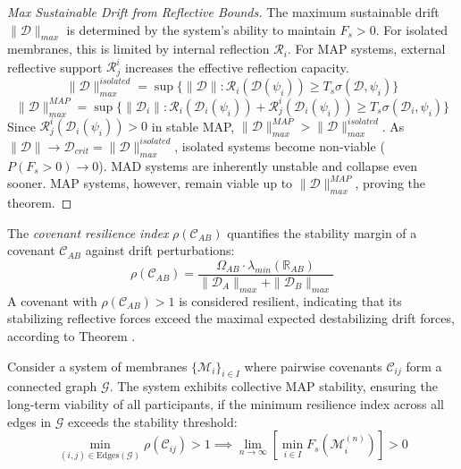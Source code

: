 \begin{proof}[Max Sustainable Drift from Reflective Bounds]
\label{proof:bk5_max_sustainable_drift}
The maximum sustainable drift $\|\mathcal{D}\|_{max}$ is determined by the system's ability to maintain $F_s > 0$. For isolated membranes, this is limited by internal reflection $\mathcal{R}_i$. For MAP systems, external reflective support $\mathcal{R}_j^i$ increases the effective reflection capacity.
\begin{equation}
\|\mathcal{D}\|_{max}^{isolated} = \sup \{\|\mathcal{D}\| : \mathcal{R}_i(\mathcal{D}(\psi_i)) \geq T_s \sigma(\mathcal{D}, \psi_i) \}
\end{equation}
\begin{equation}
\|\mathcal{D}\|_{max}^{MAP} = \sup \{\|\mathcal{D}_i\| : \mathcal{R}_i(\mathcal{D}_i(\psi_i)) + \mathcal{R}_j^i(\mathcal{D}_i(\psi_i)) \geq T_s \sigma(\mathcal{D}_i, \psi_i) \}
\end{equation}
Since $\mathcal{R}_j^i(\mathcal{D}_i(\psi_i)) > 0$ in stable MAP, $\|\mathcal{D}\|_{max}^{MAP} > \|\mathcal{D}\|_{max}^{isolated}$. As $\|\mathcal{D}\| \to \mathcal{D}_{crit} = \|\mathcal{D}\|_{max}^{isolated}$, isolated systems become non-viable ($P(F_s>0) \to 0$). MAD systems are inherently unstable and collapse even sooner. MAP systems, however, remain viable up to $\|\mathcal{D}\|_{max}^{MAP}$, proving the theorem.
\end{proof}
\begin{definition} \label{definition:bk5_covenant_resilience_index}
The \emph{covenant resilience index} $\rho(\mathcal{C}_{AB})$ quantifies the stability margin of a covenant $\mathcal{C}_{AB}$ against drift perturbations:
\begin{equation}
\rho(\mathcal{C}_{AB}) = \frac{\Omega_{AB} \cdot \lambda_{min}(\mathbb{R}_{AB})}{\|\mathcal{D}_A\|_{max} + \|\mathcal{D}_B\|_{max}}
\end{equation}
A covenant with $\rho(\mathcal{C}_{AB}) > 1$ is considered resilient, indicating that its stabilizing reflective forces exceed the maximal expected destabilizing drift forces, according to Theorem .
\end{definition}
\begin{lemma} \label{lemma:bk5_multi_membrane_map_extension}
Consider a system of membranes $\{\mathscr{M}_i\}_{i \in I}$ where pairwise covenants $\mathcal{C}_{ij}$ form a connected graph $\mathcal{G}$. The system exhibits collective MAP stability, ensuring the long-term viability of all participants, if the minimum resilience index across all edges in $\mathcal{G}$ exceeds the stability threshold:
\begin{equation}
\min_{(i,j) \in \text{Edges}(\mathcal{G})} \rho(\mathcal{C}_{ij}) > 1 \implies \lim_{n \to \infty} \left[ \min_{i \in I} F_s(\mathscr{M}_i^{(n)}) \right] > 0
\end{equation}
\end{lemma}
